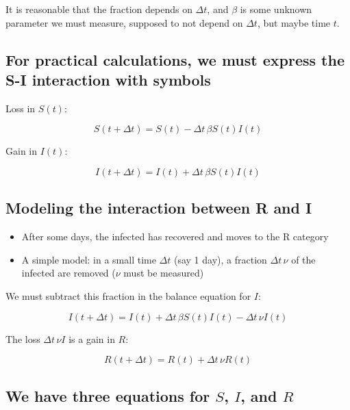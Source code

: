 \documentclass[%
twoside,                 %
final,                   %
10pt]{article}
\newenvironment{block_mdfboxadmon}[1][]{
\begin{block_mdfboxmdframed}[frametitle=#1]
}
{
\end{block_mdfboxmdframed}
}
\begin{document}
\begin{block_mdfboxadmon}[Remark.]
\vspace{0.5mm}\par\noindent
{\footnotesize It is reasonable that the fraction depends on $\Delta t$, and
$\beta$ is some unknown parameter we must measure, supposed to not
depend on $\Delta t$, but maybe time $t$.
\par}
\end{block_mdfboxadmon}



\subsection{For practical calculations, we must express the S-I interaction with symbols}

Loss in $S(t)$:

\[ S(t+\Delta t) = S(t) - \Delta t\,\beta S(t)I(t)\]

Gain in $I(t)$:

\[ I(t+\Delta t) = I(t) + \Delta t\,\beta S(t)I(t)\]

\subsection{Modeling the interaction between R and I}


\begin{block_mdfboxadmon}[R-I interaction:]
\begin{itemize}
 \item After some days, the infected has recovered and moves to the R category

 \item A simple model: in a small time $\Delta t$ (say 1 day),
   a fraction $\Delta t\,\nu$ of the infected are removed
   ($\nu$ must be measured)
\end{itemize}

\noindent
\end{block_mdfboxadmon}



We must subtract this fraction in the balance equation for $I$:

\[ I(t+\Delta t) = I(t) + \Delta t\,\beta S(t)I(t) -\Delta t\,\nu I(t) \]

The loss $\Delta t\,\nu I$ is a gain in $R$:

\[ R(t+\Delta t) = R(t) + \Delta t\,\nu R(t)\]


\subsection{We have three equations for $S$, $I$, and $R$}
\end{document}
